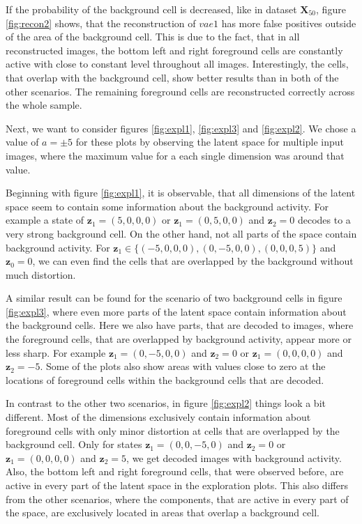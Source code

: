 \documentclass[12pt]{report}
\theoremstyle{definition}
\begin{document}
If the probability of the background cell is decreased, like in dataset $\mathbf{X}_{50}$, figure \ref{fig:recon2} shows, that the reconstruction of $vae1$ has more false positives outside of the area of the background cell. This is due to the fact, that in all reconstructed images, the bottom left and right foreground cells are constantly active with close to constant level throughout all images. Interestingly, the cells, that overlap with the background cell, show better results than in both of the other scenarios. The remaining foreground cells are reconstructed correctly across the whole sample.

Next, we want to consider figures \ref{fig:expl1}, \ref{fig:expl3} and \ref{fig:expl2}. We chose a value of $a = \pm 5$ for these plots by observing the latent space for multiple input images, where the maximum value for a each single dimension was around that value.

Beginning with figure \ref{fig:expl1}, it is observable, that all dimensions of the latent space seem to contain some information about the background activity. For example a state of $\mathbf{z}_1 = (5, 0, 0, 0)$ or $\mathbf{z}_1 = (0, 5, 0, 0)$ and $\mathbf{z}_2 = 0$ decodes to a very strong background cell. On the other hand, not all parts of the space contain background activity. For $\mathbf{z}_1 \in \{(-5, 0, 0, 0), (0, -5, 0, 0), (0, 0, 0, 5)\}$ and $\mathbf{z}_0 = 0$, we can even find the cells that are overlapped by the background without much distortion.

A similar result can be found for the scenario of two background cells in figure \ref{fig:expl3}, where even more parts of the latent space contain information about the background cells. Here we also have parts, that are decoded to images, where the foreground cells, that are overlapped by background activity, appear more or less sharp. For example $\mathbf{z}_1 = (0, -5, 0, 0)$ and $\mathbf{z}_2=0$ or $\mathbf{z}_1 = (0, 0, 0, 0)$ and $\mathbf{z}_2 = -5$. Some of the plots also show areas with values close to zero at the locations of foreground cells within the background cells that are decoded.

In contrast to the other two scenarios, in figure \ref{fig:expl2} things look a bit different. Most of the dimensions exclusively contain information about foreground cells with only minor distortion at cells that are overlapped by the background cell. Only for states $\mathbf{z}_1 = (0, 0, -5, 0)$ and $\mathbf{z}_2=0$ or $\mathbf{z}_1 = (0, 0, 0, 0)$ and $\mathbf{z}_2 = 5$, we get decoded images with background activity. Also, the bottom left and right foreground cells, that were observed before, are active in every part of the latent space in the exploration plots. This also differs from the other scenarios, where the components, that are active in every part of the space, are exclusively located in areas that overlap a background cell.
\end{document}
